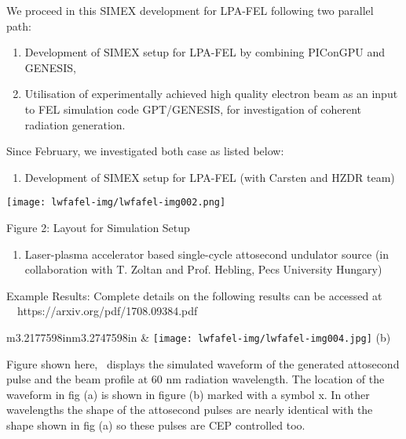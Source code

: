 \documentclass{article}
\makeatletter
\newcommand\arraybslash{\let\\\@arraycr}
\makeatother
\begin{document}
\bigskip

We proceed in this SIMEX development for LPA-FEL following two parallel path:


\bigskip

\begin{enumerate}
\item Development of SIMEX setup for LPA-FEL by combining PIConGPU and GENESIS,
\item Utilisation of experimentally achieved high quality electron beam as an
input to FEL simulation code GPT/GENESIS, for investigation of coherent
radiation generation.
\end{enumerate}

\bigskip

Since February, we investigated both case as listed below:


\bigskip

\begin{enumerate}
\item Development of SIMEX setup for LPA-FEL (with Carsten and HZDR team)
\end{enumerate}

\bigskip


\texttt{[image: lwfafel-img/lwfafel-img002.png]}


Figure 2: Layout for Simulation Setup


\bigskip

\begin{enumerate}
\item Laser-plasma accelerator based single-cycle attosecond undulator source
(in collaboration with T. Zoltan and Prof. Hebling, Pecs University Hungary)
\end{enumerate}

\bigskip

Example Results: Complete details on the following results can be accessed at
\ \ https://arxiv.org/pdf/1708.09384.pdf

\begin{flushleft}
\tablefirsthead{}
\tablehead{}
\tabletail{}
\tablelasttail{}
\begin{supertabular}{m{3.2177598in}m{3.2747598in}}
 &
\centering\arraybslash{ 
\texttt{[image: lwfafel-img/lwfafel-img004.jpg]}
(b)}\\
\\
\end{supertabular}
\end{flushleft}
Figure shown here, \ displays the simulated waveform of the generated attosecond
pulse and the beam profile at 60 nm radiation wavelength. The location of the
waveform in fig (a) is shown in figure (b) marked with a symbol x. In other
wavelengths the shape of the attosecond pulses are nearly identical with the
shape shown in fig (a) so these pulses are CEP controlled too.
\end{document}
